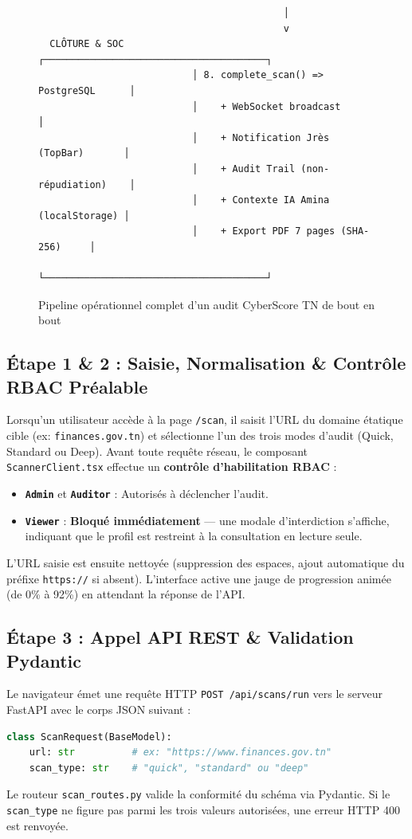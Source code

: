 \begin{figure}[!htbp]
\begin{verbatim}
                                           │
                                           v
  CLÔTURE & SOC            ┌───────────────────────────────────────┐
                           │ 8. complete_scan() => PostgreSQL      │
                           │    + WebSocket broadcast              │
                           │    + Notification Jrès (TopBar)       │
                           │    + Audit Trail (non-répudiation)    │
                           │    + Contexte IA Amina (localStorage) │
                           │    + Export PDF 7 pages (SHA-256)     │
                           └───────────────────────────────────────┘
\end{verbatim}
\caption{Pipeline opérationnel complet d'un audit CyberScore TN de bout en bout}
\label{fig:scan_pipeline}
\end{figure}

\subsection{Étape 1 \& 2 : Saisie, Normalisation \& Contrôle RBAC Préalable}
Lorsqu'un utilisateur accède à la page \texttt{/scan}, il saisit l'URL du domaine étatique cible (ex: \texttt{finances.gov.tn}) et sélectionne l'un des trois modes d'audit (Quick, Standard ou Deep). Avant toute requête réseau, le composant \texttt{ScannerClient.tsx} effectue un \textbf{contrôle d'habilitation RBAC} :
\begin{itemize}
    \item \textbf{\texttt{Admin}} et \textbf{\texttt{Auditor}} : Autorisés à déclencher l'audit.
    \item \textbf{\texttt{Viewer}} : \textbf{Bloqué immédiatement} — une modale d'interdiction s'affiche, indiquant que le profil est restreint à la consultation en lecture seule.
\end{itemize}
L'URL saisie est ensuite nettoyée (suppression des espaces, ajout automatique du préfixe \texttt{https://} si absent). L'interface active une jauge de progression animée (de 0\% à 92\%) en attendant la réponse de l'API.

\subsection{Étape 3 : Appel API REST \& Validation Pydantic}
Le navigateur émet une requête HTTP \texttt{POST /api/scans/run} vers le serveur FastAPI avec le corps JSON suivant :
\begin{lstlisting}[language=Python, caption={Schema Pydantic de la requete de scan}]
class ScanRequest(BaseModel):
    url: str          # ex: "https://www.finances.gov.tn"
    scan_type: str    # "quick", "standard" ou "deep"
\end{lstlisting}
Le routeur \texttt{scan\_routes.py} valide la conformité du schéma via Pydantic. Si le \texttt{scan\_type} ne figure pas parmi les trois valeurs autorisées, une erreur HTTP 400 est renvoyée.

